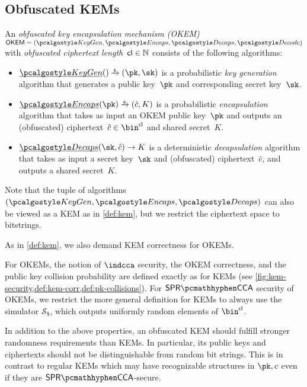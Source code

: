 \subsection{Obfuscated KEMs}

\begin{definition}
    \label{def:okem}
    An \emph{obfuscated key encapsulation mechanism (OKEM)} $\OKEM = (\kgen, \encaps, \decaps, \decode)$ with \emph{obfuscated ciphertext length}~$\mathsf{cl} \in \mathbb{N}$ consists of the following algorithms:
    \begin{itemize}
        \item $\ul{\kgen}() \tor (\pk,\sk)$ is a probabilistic \emph{key generation} algorithm that generates a public key~$\pk$ and corresponding secret key~$\sk$.

        \item $\ul{\encaps}(\pk) \tor (\hat c, K)$ is a probabilistic \emph{encapsulation} algorithm that takes as input an OKEM public key~$\pk$ and outputs an (obfuscated) ciphertext~$\hat c \in \bin^\obfctxtlen$ and shared secret~$K$.

        \item $\ul{\decaps}(\sk,\hat c) \to K$ is a deterministic \emph{decapsulation} algorithm that takes as input a secret key~$\sk$ and (obfuscated) ciphertext~$\hat c$, and outputs a shared secret~$K$.
    \end{itemize}
    Note that the tuple of algorithms $(\kgen, \encaps, \decaps)$ can also be viewed as a KEM as in \cref{def:kem}, but we restrict the ciphertext space to bitstrings.

    As in \cref{def:kem}, we also demand KEM correctness for OKEMs.
\end{definition}

For OKEMs, the notion of $\indcca$ security, the OKEM correctness, and the public key collision probability are defined exactly as for KEMs (see \cref{fig:kem-security,def:kem-corr,def:pk-collisions}). For $\sprcca$ security of OKEMs, we restrict the more general definition for KEMs to always use the simulator $\mathcal S_\$$, which outputs uniformly random elements of $\bin^\obfctxtlen$.

In addition to the above properties, an obfuscated KEM should fulfill stronger randomness requirements than KEMs. In particular, its public keys and ciphertexts should not be distinguishable from random bit strings. This is in contrast to regular KEMs which may have recognizable structures in $\pk, c$ even if they are $\sprcca$-secure.

